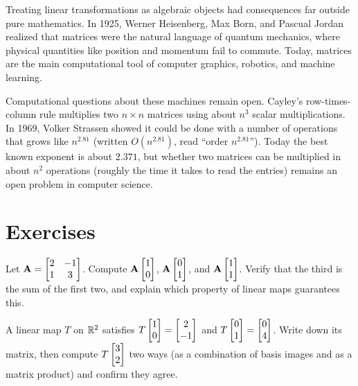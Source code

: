 \begin{historybox}
Treating linear transformations as algebraic objects had consequences far outside
pure mathematics. In 1925, Werner Heisenberg, Max Born, and Pascual Jordan realized
that matrices were the natural language of quantum mechanics, where physical
quantities like position and momentum fail to commute. Today, matrices are the
main computational tool of computer graphics, robotics, and machine learning.

Computational questions about these machines remain open. Cayley's row-times-column
rule multiplies two $n \times n$ matrices using about $n^3$ scalar
multiplications. In 1969, Volker Strassen showed it could be done with a number of
operations that grows like $n^{2.81}$ (written $O(n^{2.81})$, read ``order
$n^{2.81}$''). Today the best known exponent is about $2.371$,
but whether two matrices can be multiplied in about $n^2$ operations (roughly
the time it takes to read the entries) remains an open problem in computer
science.
\end{historybox}

\section{Exercises}
\label{ch05:exercises}

\begin{exercise}
\label{ch05:ex-act}
Let $\mathbf{A} = \begin{bmatrix} 2 & -1 \\ 1 & 3 \end{bmatrix}$. Compute
$\mathbf{A}\begin{bmatrix}1\\0\end{bmatrix}$, $\mathbf{A}\begin{bmatrix}0\\1\end{bmatrix}$, and $\mathbf{A}\begin{bmatrix}1\\1\end{bmatrix}$. Verify
that the third is the sum of the first two, and explain which property of linear
maps guarantees this.
\end{exercise}

\begin{exercise}
\label{ch05:ex-build}
A linear map $T$ on $\mathbb{R}^2$ satisfies $T\begin{bmatrix}1\\0\end{bmatrix} = \begin{bmatrix}2\\-1\end{bmatrix}$ and
$T\begin{bmatrix}0\\1\end{bmatrix} = \begin{bmatrix}0\\4\end{bmatrix}$. Write down its matrix, then compute
$T\begin{bmatrix}3\\2\end{bmatrix}$ two ways (as a combination of basis images and as a matrix
product) and confirm they agree.
\end{exercise}

